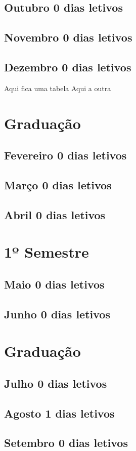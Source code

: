 \documentclass[thesis]{hmcposter}
\begin{document}
\begin{poster}
\subsection{Outubro \hfill 0 dias letivos}\subsection{Novembro \hfill 0 dias letivos}\subsection{Dezembro \hfill 0 dias letivos}\newpage
Aqui fica uma tabela
\vfill\null
\columnbreak
Aqui a outra
\newpage
\section{\color{hmcorange}Graduação}\subsection{Fevereiro \hfill 0 dias letivos}\subsection{Março \hfill 0 dias letivos}\subsection{Abril \hfill 0 dias letivos}\vfill\null
\columnbreak
\section{\hfill \color{hmcorange}1º Semestre}
\subsection{Maio \hfill 0 dias letivos}\subsection{Junho \hfill 0 dias letivos}\newpage
\section{\color{hmcorange}Graduação}\subsection{Julho \hfill 0 dias letivos}\subsection{Agosto \hfill 1 dias letivos}\subsection{Setembro \hfill 0 dias letivos}\vfill\null
\columnbreak

\end{poster}
\end{document}
